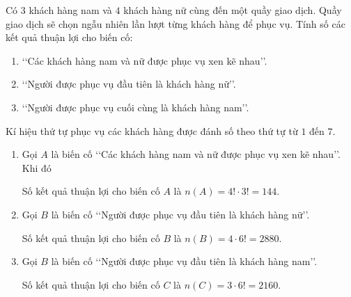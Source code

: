 \begin{bt}%
	Có $3$ khách hàng nam và $4$ khách hàng nữ cùng đến một quầy giao dịch. Quầy giao dịch sẽ chọn ngẫu nhiên lần lượt từng khách hàng để phục vụ. Tính số các kết quả thuận lợi cho biến cố:
	\begin{enumerate}
		\item \lq\lq Các khách hàng nam và nữ được phục vụ xen kẽ nhau\rq\rq.
		\item \lq\lq Người được phục vụ đầu tiên là khách hàng nữ\rq\rq.
		\item \lq\lq Người được phục vụ cuối cùng là khách hàng nam\rq\rq.
	\end{enumerate}
	\loigiai
	{
		Kí hiệu thứ tự phục vụ các khách hàng được đánh số theo thứ tự từ $1$ đến $7$.
		\begin{enumerate}
			\item Gọi $A$ là biến cố \lq\lq Các khách hàng nam và nữ được phục vụ xen kẽ nhau\rq\rq. Khi đó
			Số kết quả thuận lợi cho biến cố $A$ là $n(A)= 4! \cdot 3!= 144$.
			\item Gọi $B$ là biến cố \lq\lq Người được phục vụ đầu tiên là khách hàng nữ\rq\rq.
			Số kết quả thuận lợi cho biến cố $B$ là $n(B)= 4\cdot 6!= 2880$.
			\item Gọi $B$ là biến cố \lq\lq Người được phục vụ đầu tiên là khách hàng nam\rq\rq.
			Số kết quả thuận lợi cho biến cố $C$ là $n(C)= 3\cdot 6!= 2160$.
		\end{enumerate}
	}
\end{bt}
	
